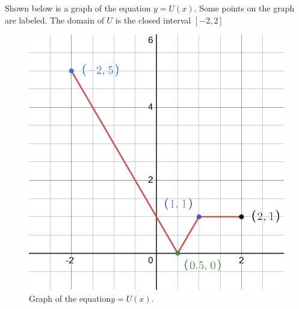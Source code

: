 \documentclass[12pt,fleqn,answers]{exam}
\newcommand{\range}{\mbox{range}}
\begin{document}
\begin{questions}
\begin{solution}
\end{solution}
\newpage

\question Shown below is a graph of the equation $y = U(x)$. 
Some points on the graph are labeled. The domain of $U$ is
the closed interval $[-2,2]$

\begin{figure}[h]
    \begin{center}
    \includegraphics[scale=0.2]{desmos-graph(14).png}
\end{center}
\caption{Graph of the equation$y = U(x)$.}
\end{figure}

\end{questions}
\end{document}
